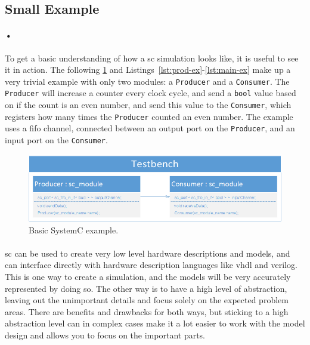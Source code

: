 \documentclass[a4paper, 12pt, openright, twoside]{report}
\newcommand{\codeword}[1]{\texttt{#1}}
\begin{document}
\subsection{Small Example}

\paragraph{•}
To get a basic understanding of how a \gls{sc} simulation looks like, it is useful to see it in action.
The following \ref{fig:sc-ex} and Listings~\ref{lst:prod-ex}-\ref{lst:main-ex} make up a very trivial example with only two modules: a \codeword{Producer} and a \codeword{Consumer}.
The \codeword{Producer} will increase a counter every clock cycle, and send a \codeword{bool} value based on if the count is an even number, and send this value to the \codeword{Consumer}, which registers how many times the \codeword{Producer} counted an even number.
The example uses a \gls{fifo} channel, connected between an output port on the \codeword{Producer}, and an input port on the \codeword{Consumer}.

\begin{figure}[h!]
  \centering
    \includegraphics[width=1.0\textwidth]{images/sc-example.png}
     \caption{Basic SystemC example.}
    \label{fig:sc-ex}
\end{figure}

\noindent
\begin{minipage}{\linewidth}

\end{minipage}
\begin{minipage}{\linewidth}

\end{minipage}
\begin{minipage}{\linewidth}

\end{minipage}

\paragraph{}
\gls{sc} can be used to create very low level hardware descriptions and models, and can interface directly with hardware description languages like \gls{vhdl} and \gls{verilog}.
This is one way to create a simulation, and the models will be very accurately represented by doing so.
The other way is to have a high level of abstraction, leaving out the unimportant details and focus solely on the expected problem areas.
There are benefits and drawbacks for both ways, but sticking to a high abstraction level can in complex cases make it a lot easier to work with the model design and allows you to focus on the important parts.
\end{document}
